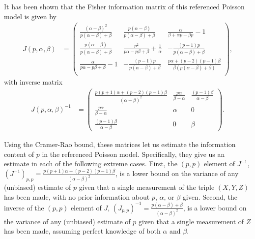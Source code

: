 \documentclass[aps,nofootinbib,twocolumn,superscriptaddress]{revtex4}
\begin{document}
It has been shown\cite{hincks_statistical_2018} that the
Fisher information matrix of this
referenced Poisson model is given by
\begin{align}
    J(p,\alpha,\beta) &=
        \begin{pmatrix}
            \frac{(\alpha -\beta )^2}{p (\alpha -\beta )+\beta } &
            \frac{p (\alpha -\beta )}{p (\alpha -\beta )+\beta } &
            \frac{\alpha }{\beta +\alpha  p-\beta  p}-1 \\
            \frac{p (\alpha -\beta )}{p (\alpha -\beta )+\beta } &
            \frac{p^2}{p \alpha -p \beta +\beta }+\frac{1}{\alpha } &
            -\frac{(p-1) p}{p (\alpha -\beta )+\beta } \\
            \frac{\alpha }{p \alpha -p \beta +\beta }-1 &
            -\frac{(p-1) p}{p (\alpha -\beta )+\beta } &
            \frac{p \alpha +(p-2) (p-1) \beta }{\beta  (p (\alpha -\beta )+\beta )} \\
        \end{pmatrix},
\end{align}
with inverse matrix
\begin{align}
    J(p,\alpha,\beta)^{-1}
        &=
        \begin{pmatrix}
            \frac{p (p+1) \alpha +(p-2) (p-1) \beta }{(\alpha -\beta )^2} &
            \frac{p \alpha }{\beta -\alpha } &
            \frac{(p-1) \beta }{\alpha -\beta } \\
            \frac{p \alpha }{\beta -\alpha } &
            \alpha  &
            0 \\
            \frac{(p-1) \beta }{\alpha -\beta } &
            0 &
            \beta
        \end{pmatrix}.
\end{align}

Using the Cramer-Rao bound, these matrices let us
estimate the information content of $p$ in the referenced
Poisson model.
Specifically, they give us an estimate in each of the following
extreme cases.
First, the $(p,p)$ element of $J^{-1}$,
$(J^{-1})_{p,p}=\frac{p (p+1) \alpha +(p-2) (p-1) \beta }{(\alpha -\beta )^2}$,
is a lower bound on the variance of any (unbiased) estimate of $p$ given that
a single measurement of the triple $(X,Y,Z)$ has been made,
with no prior information
about $p$, $\alpha$, or $\beta$ given.
Second, the inverse of the $(p,p)$ element of $J$,
$(J_{p,p})^{-1}=\frac{p (\alpha -\beta )+\beta}{(\alpha -\beta )^2 }$,
 is a lower bound on
the variance of any (unbiased) estimate of $p$ given that a single
measurement of $Z$ has been made, assuming perfect knowledge of
both $\alpha$ and $\beta$.
\end{document}
